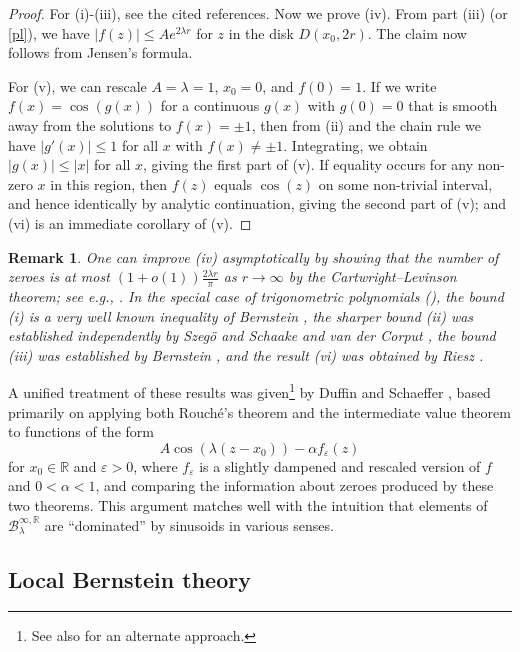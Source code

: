 \documentclass[12pt]{amsart}
\newtheorem{remark}[theorem]{Remark}
\newcommand{\eps}{\varepsilon}
\newcommand{\R}{\mathbb{R}}
\begin{document}
\begin{proof}  For (i)-(iii), see the cited references.
Now we prove (iv).  From part (iii) (or \eqref{pl}), we have $|f(z)| \leq A e^{2\lambda r}$ for $z$ in the disk $D(x_0, 2r)$.  The claim now follows from Jensen's formula.

    For (v), we can rescale $A=\lambda=1$, $x_0=0$, and $f(0)=1$.  If we write $f(x) = \cos(g(x))$ for a continuous $g(x)$ with $g(0)=0$ that is smooth away from the solutions to $f(x) = \pm 1$, then from (ii) and the chain rule we have $|g'(x)| \leq 1$ for all $x$ with $f(x) \neq \pm 1$.  Integrating, we obtain $|g(x)| \leq |x|$ for all $x$, giving the first part of (v).  If equality occurs for any non-zero $x$ in this region, then $f(z)$ equals $\cos(z)$ on some non-trivial interval, and hence identically by analytic continuation, giving the second part of (v); and (vi) is an immediate corollary of (v).
\end{proof}

\begin{remark} One can improve (iv) asymptotically by showing that the number of zeroes is at most $(1+o(1)) \frac{2\lambda r}{\pi}$ as $r \to \infty$ by the Cartwright--Levinson theorem; see e.g., \cite{levin}.  In the special case of trigonometric polynomials (), the bound (i) is a very well known inequality of Bernstein \cite{bernstein}, the sharper bound (ii) was established independently by Szeg\"o \cite{szego} and Schaake and van der Corput \cite{vdc}, the bound (iii) was established by Bernstein \cite{bern3}, and the result (vi) was obtained by Riesz \cite{riesz}.
\end{remark}

A unified treatment of these results was given\footnote{See also \cite{rahman} for an alternate approach.} by Duffin and Schaeffer \cite{duffin}, based primarily on applying both Rouch\'e's theorem and the intermediate value theorem to functions of the form
$$ A \cos(\lambda(z-x_0)) - \alpha f_\eps(z)$$
for $x_0 \in\R$ and $\eps>0$, where $f_\eps$ is a slightly dampened and rescaled version of $f$ and $0 < \alpha < 1$, and comparing the information about zeroes produced by these two theorems.  This argument matches well with the intuition that elements of ${\mathcal B}^{\infty,\R}_\lambda$ are ``dominated'' by sinusoids in various senses.

\subsection{Local Bernstein theory}
\end{document}
